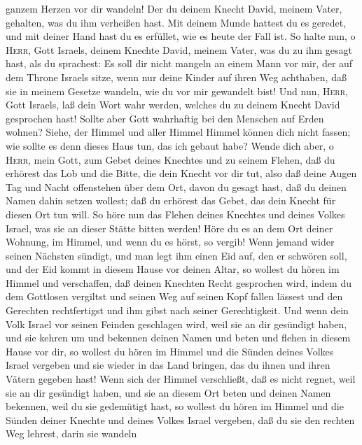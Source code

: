 ganzem Herzen vor dir wandeln!  Der du deinem Knecht
David, meinem Vater, gehalten, was du ihm verheißen hast. Mit deinem
Munde hattest du es geredet, und mit deiner Hand hast du es erfüllet,
wie es heute der Fall ist.  So halte nun, o
\textsc{Herr}, Gott Israels, deinem Knechte David, meinem Vater, was du
zu ihm gesagt hast, als du sprachest: Es soll dir nicht mangeln an einem
Mann vor mir, der auf dem Throne Israels sitze, wenn nur deine Kinder
auf ihren Weg achthaben, daß sie in meinem Gesetze wandeln, wie du vor
mir gewandelt bist!  Und nun, \textsc{Herr}, Gott
Israels, laß dein Wort wahr werden, welches du zu deinem Knecht David
gesprochen hast!  Sollte aber Gott wahrhaftig bei den
Menschen auf Erden wohnen? Siehe, der Himmel und aller Himmel Himmel
können dich nicht fassen; wie sollte es denn dieses Haus tun, das ich
gebaut habe?  Wende dich aber, o \textsc{Herr}, mein
Gott, zum Gebet deines Knechtes und zu seinem Flehen, daß du erhörest
das Lob und die Bitte, die dein Knecht vor dir tut,  also
daß deine Augen Tag und Nacht offenstehen über dem Ort, davon du gesagt
hast, daß du deinen Namen dahin setzen wollest; daß du erhörest das
Gebet, das dein Knecht für diesen Ort tun will.  So höre
nun das Flehen deines Knechtes und deines Volkes Israel, was sie an
dieser Stätte bitten werden! Höre du es an dem Ort deiner Wohnung, im
Himmel, und wenn du es hörst, so vergib!  Wenn jemand
wider seinen Nächsten sündigt, und man legt ihm einen Eid auf, den er
schwören soll, und der Eid kommt in diesem Hause vor deinen Altar,
 so wollest du hören im Himmel und verschaffen, daß
deinen Knechten Recht gesprochen wird, indem du dem Gottlosen vergiltst
und seinen Weg auf seinen Kopf fallen lässest und den Gerechten
rechtfertigst und ihm gibst nach seiner Gerechtigkeit. 
Und wenn dein Volk Israel vor seinen Feinden geschlagen wird, weil sie
an dir gesündigt haben, und sie kehren um und bekennen deinen Namen und
beten und flehen in diesem Hause vor dir,  so wollest du
hören im Himmel und die Sünden deines Volkes Israel vergeben und sie
wieder in das Land bringen, das du ihnen und ihren Vätern gegeben hast!
 Wenn sich der Himmel verschließt, daß es nicht regnet,
weil sie an dir gesündigt haben, und sie an diesem Ort beten und deinen
Namen bekennen, weil du sie gedemütigt hast,  so wollest
du hören im Himmel und die Sünden deiner Knechte und deines Volkes
Israel vergeben, daß du sie den rechten Weg lehrest, darin sie wandeln
